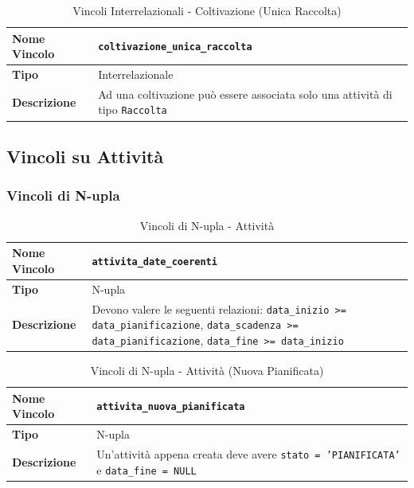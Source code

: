\documentclass[12pt,a4paper]{article}
\begin{document}
\begin{table}[H]
\centering
\caption{Vincoli Interrelazionali - Coltivazione (Unica Raccolta)}
\begin{tabularx}{\textwidth}{|l|X|}
\hline
\textbf{Nome Vincolo} & \texttt{coltivazione\_unica\_raccolta} \\
\hline
\textbf{Tipo} & Interrelazionale \\
\hline
\textbf{Descrizione} & Ad una coltivazione può essere associata solo una attività di tipo \texttt{Raccolta} \\
\hline
\end{tabularx}
\end{table}

\subsection{Vincoli su Attività}

\subsubsection{Vincoli di N-upla}

\begin{table}[H]
\centering
\caption{Vincoli di N-upla - Attività}
\begin{tabularx}{\textwidth}{|l|X|}
\hline
\textbf{Nome Vincolo} & \texttt{attivita\_date\_coerenti} \\
\hline
\textbf{Tipo} & N-upla \\
\hline
\textbf{Descrizione} & Devono valere le seguenti relazioni: \texttt{data\_inizio >= data\_pianificazione}, \texttt{data\_scadenza >= data\_pianificazione}, \texttt{data\_fine >= data\_inizio} \\
\hline
\end{tabularx}
\end{table}

\begin{table}[H]
\centering
\caption{Vincoli di N-upla - Attività (Nuova Pianificata)}
\begin{tabularx}{\textwidth}{|l|X|}
\hline
\textbf{Nome Vincolo} & \texttt{attivita\_nuova\_pianificata} \\
\hline
\textbf{Tipo} & N-upla \\
\hline
\textbf{Descrizione} & Un'attività appena creata deve avere \texttt{stato = 'PIANIFICATA'} e \texttt{data\_fine = NULL} \\
\hline
\end{tabularx}
\end{table}
\end{document}
